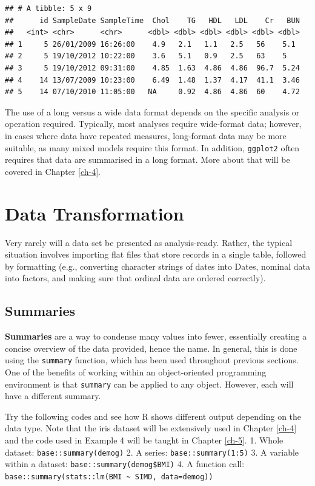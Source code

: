 \documentclass[
]{book}
\begin{document}
\begin{verbatim}
## # A tibble: 5 x 9
##      id SampleDate SampleTime  Chol    TG   HDL   LDL    Cr   BUN
##   <int> <chr>      <chr>      <dbl> <dbl> <dbl> <dbl> <dbl> <dbl>
## 1     5 26/01/2009 16:26:00    4.9   2.1   1.1   2.5   56    5.1 
## 2     5 19/10/2012 10:22:00    3.6   5.1   0.9   2.5   63    5   
## 3     5 19/10/2012 09:31:00    4.85  1.63  4.86  4.86  96.7  5.24
## 4    14 13/07/2009 10:23:00    6.49  1.48  1.37  4.17  41.1  3.46
## 5    14 07/10/2010 11:05:00   NA     0.92  4.86  4.86  60    4.72
\end{verbatim}

The use of a long versus a wide data format depends on the specific analysis or operation required. Typically, most analyses require wide-format data; however, in cases where data have repeated measures, long-format data may be more suitable, as many mixed models require this format. In addition, \texttt{ggplot2} often requires that data are summarised in a long format. More about that will be covered in Chapter \ref{ch-4}.

\section{Data Transformation}\label{sec:dataTransformation}

Very rarely will a data set be presented as analysis-ready. Rather, the typical situation involves importing flat files that store records in a single table, followed by formatting (e.g., converting character strings of dates into Dates, nominal data into factors, and making sure that ordinal data are ordered correctly).

\subsection{Summaries}\label{sec:summary}

\textbf{Summaries} are a way to condense many values into fewer, essentially creating a concise overview of the data provided, hence the name. In general, this is done using the \texttt{summary} function, which has been used throughout previous sections. One of the benefits of working within an object-oriented programming environment is that \texttt{summary} can be applied to any object. However, each will have a different summary.

Try the following codes and see how R shows different output depending on the data type. Note that the iris dataset will be extensively used in Chapter \ref{ch-4} and the code used in Example 4 will be taught in Chapter \ref{ch-5}.
1. Whole dataset: \texttt{base::summary(demog)}
2. A series: \texttt{base::summary(1:5)}
3. A variable within a dataset: \texttt{base::summary(demog\$BMI)}
4. A function call: \texttt{base::summary(stats::lm(BMI\ \textasciitilde{}\ SIMD,\ data=demog))}
\end{document}
